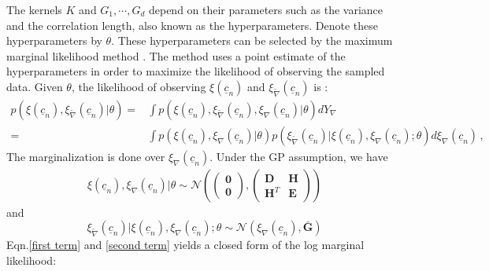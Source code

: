 \documentclass[a4paper,onecolumn]{article}
\theoremstyle{remark}
\begin{document}
\indent The kernels $K$ and $G_1, \cdots, G_d$ depend on their parameters such as the 
variance and the correlation length,
also known as the hyperparameters. Denote these hyperparameters by $\theta$.
These hyperparameters can be selected by the 
maximum marginal likelihood method \cite{jones1998}. 
The method uses a point estimate of the hyperparameters in order to maximize the likelihood of 
observing the sampled data. Given $\theta$, the likelihood of observing 
$\xi(\underline{c}_n)$ 
and $\xi_{\tilde{\nabla}}(\underline{c}_n)$ is :
\begin{equation}\begin{split}
    p\left(\xi(\underline{c}_n), \xi_{\tilde{\nabla}}(\underline{c}_n) |\theta \right) 
    =& \int p(\xi(\underline{c}_n), \xi_{\tilde{\nabla}}(\underline{c}_n) ,
              \xi_{\nabla}(\underline{c}_n) | \theta) d Y_{\nabla}\\
    =& \int p\left(\xi(\underline{c}_n),\xi_{\nabla}(\underline{c}_n) | \theta\right) 
      p\left( \xi_{\tilde{\nabla}}(\underline{c}_n) | \xi(\underline{c}_n),\xi_{\nabla}(\underline{c}_n)
      ;\theta \right)
      d\xi_{\nabla}(\underline{c}_n)\,,
    \label{marginal likelihood}
\end{split}\end{equation}
The marginalization is done over $\xi_{\nabla}(\underline{c}_n)$.
Under the GP assumption, we have
\begin{equation}\begin{split}
    \xi(\underline{c}_n),\xi_{\nabla}(\underline{c}_n) \Big| \theta \sim \mathcal{N}\left(
        \begin{pmatrix}
            \mathbf{0}\\
            \mathbf{0}
        \end{pmatrix},
        \begin{pmatrix}
            \mathbf{D} & \mathbf{H} \\
            \mathbf{H}^T & \mathbf{E}
        \end{pmatrix}
    \right)
\end{split}
\label{first term}
\end{equation}
and
\begin{equation}
    \xi_{\tilde{\nabla}}(\underline{c}_n) | \xi(\underline{c}_n),
    \xi_\nabla(\underline{c}_n); \theta
    \sim 
    \mathcal{N} 
    \left(
            \xi_{\nabla}(\underline{c}_n)
        ,
            \bar{\mathbf{G}}
    \right)
\label{second term}
\end{equation}
Eqn.\eqref{first term} and \eqref{second term} yields a closed form of the log marginal likelihood:
\end{document}
